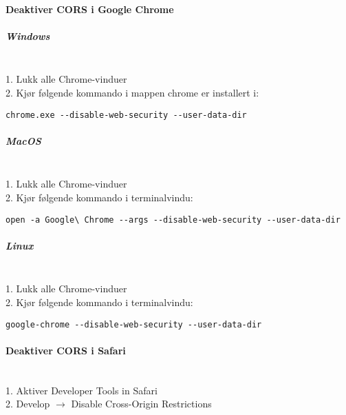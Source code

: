 \paragraph{\textbf{Deaktiver CORS i Google Chrome}}\mbox{}
\subparagraph{{Windows}}\mbox{}\\
1. Lukk alle Chrome-vinduer\\
2. Kjør følgende kommando i mappen chrome er installert i:
\begin{verbatim}
chrome.exe --disable-web-security --user-data-dir
\end{verbatim}

\subparagraph{{MacOS}}\mbox{}\\
1. Lukk alle Chrome-vinduer\\
2. Kjør følgende kommando i terminalvindu:
\begin{verbatim}
open -a Google\ Chrome --args --disable-web-security --user-data-dir
\end{verbatim}

\subparagraph{{Linux}}\mbox{}\\
1. Lukk alle Chrome-vinduer\\
2. Kjør følgende kommando i terminalvindu:
\begin{verbatim}
google-chrome --disable-web-security --user-data-dir
\end{verbatim}

\paragraph{\textbf{Deaktiver CORS i Safari}}\mbox{}\\
1. Aktiver Developer Tools in Safari\\
2. Develop $\rightarrow$ Disable Cross-Origin Restrictions